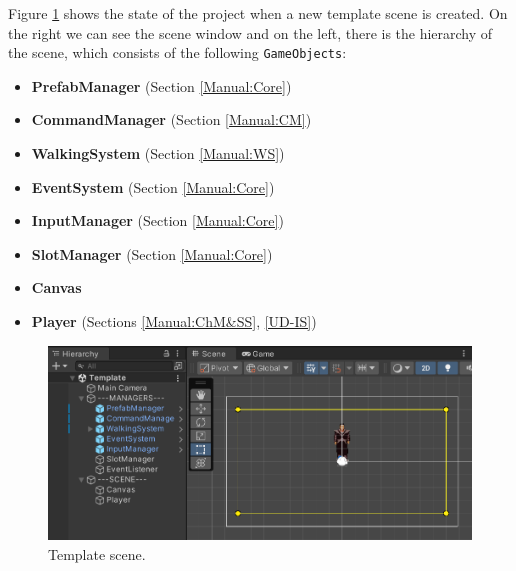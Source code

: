 Figure \ref{fig:Tutorial-template} shows the state of the project when a new template scene is created. On the right we can see  the scene window and on the left, there is the hierarchy of the scene, which consists of the following \verb|GameObjects|:
\begin{itemize}
    \item \textbf{PrefabManager} (Section \ref{Manual:Core})
    \item \textbf{CommandManager} (Section \ref{Manual:CM})
    \item \textbf{WalkingSystem} (Section \ref{Manual:WS})
    \item \textbf{EventSystem} (Section \ref{Manual:Core})
    \item \textbf{InputManager} (Section \ref{Manual:Core})
    \item \textbf{SlotManager} (Section \ref{Manual:Core})
    \item \textbf{Canvas}
    \item \textbf{Player} (Sections \ref{Manual:ChM&SS}, \ref{UD-IS})
\end{itemize}

\begin{figure}[H]
\centering
\includegraphics[width=.9\linewidth]{img/User doc/image_2025-07-08_100816915.png}
\caption{Template scene.}
\label{fig:Tutorial-template}
\end{figure}


